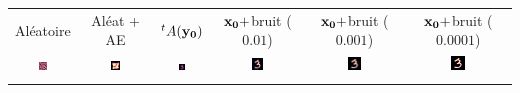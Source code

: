 \begin{tabular}{c c c c c c}
Aléatoire  &  Aléat + AE  &  $^tA(\bf{y_0})$  & $\bf{x_0}+$bruit ($0.01$)  & $\bf{x_0}+$bruit ($0.001$)  & $\bf{x_0}+$bruit ($0.0001$) 

\\


%
\includegraphics[width=0.15\textwidth]{resultats (legacy)/PGD/comp-inits_1-init-pas=1e-20_filtre=g-0.5.png}
&
\includegraphics[width=0.15\textwidth]{resultats (legacy)/PGD/comp-inits_2-init-pas=1e-20_filtre=g-0.5.png}
&
\includegraphics[width=0.15\textwidth]{resultats (legacy)/PGD/comp-inits_3-init-pas=1e-20_filtre=g-0.5.png}
&
\includegraphics[width=0.15\textwidth]{resultats (legacy)/PGD/comp-inits_4-init-pas=1e-20_filtre=g-0.5.png}
&
\includegraphics[width=0.15\textwidth]{resultats (legacy)/PGD/comp-inits_5-init-pas=1e-20_filtre=g-0.5.png}
&
\includegraphics[width=0.15\textwidth]{resultats (legacy)/PGD/comp-inits_6-init-pas=1e-20_filtre=g-0.5.png}

\\ \\




\end{tabular}
